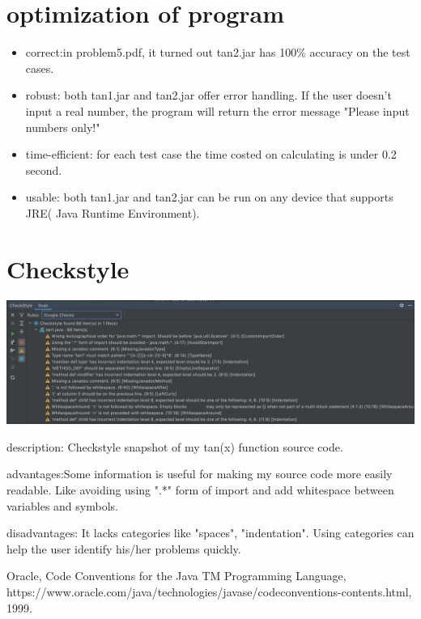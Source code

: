 \documentclass[10pt,a4paper,twoside]{article}
\begin{document}
\section{optimization of program}
\begin{itemize}
    \item correct:in problem5.pdf, it turned out tan2.jar has 100\% accuracy on the test cases.
    \item robust: both tan1.jar and tan2.jar offer error handling. If the user doesn't input a real number, the program will return the error message "Please input numbers only!"
    \item time-efficient: for each test case the time costed on calculating is under 0.2 second.
    \item usable: both tan1.jar and tan2.jar can be run on any device that supports JRE( Java Runtime Environment).
\end{itemize}
\section{Checkstyle}
\includegraphics[scale=0.15]{Checkstyle.png}
\item
description: Checkstyle snapshot of my tan(x) function source code.
\item
advantages:Some information is useful for making my source code more easily readable. Like avoiding using ".*" form of import and add whitespace between variables and symbols.
\item
disadvantages: It lacks categories like "spaces", "indentation". Using categories can help the user identify his/her problems quickly.




\begin{thebibliography}{99}  
Oracle, Code Conventions for the Java TM Programming Language, https://www.oracle.com/java/technologies/javase/codeconventions-contents.html, 1999.  
\end{thebibliography}
\end{document}
